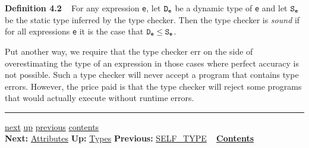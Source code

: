 \documentclass[]{article}
\begin{document}
\textbf{Definition 4.2} ~ For any expression \texttt{e}, let $\tt D_e$
be a dynamic type of \texttt{e} and let $\tt S_e$ be the static type
inferred by the type checker. Then the type checker is \emph{sound} if
for all expressions \texttt{e} it is the case that $\tt D_e \leq S_e$.

Put another way, we require that the type checker err on the side of
overestimating the type of an expression in those cases where perfect
accuracy is not possible. Such a type checker will never accept a
program that contains type errors. However, the price paid is that the
type checker will reject some programs that would actually execute
without runtime errors.

\begin{center}\rule{3in}{0.4pt}\end{center}

\href{node10.html}{next} \href{node7.html}{up}
\href{node8.html}{previous} \href{node1.html}{contents} \\
\textbf{Next:} \href{node10.html}{Attributes} \textbf{Up:}
\href{node7.html}{Types} \textbf{Previous:}
\href{node8.html}{SELF\_TYPE} ~ \textbf{\href{node1.html}{Contents}}
\end{document}
